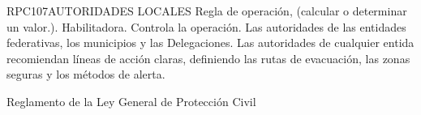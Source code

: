 \begin{BusinessRule}{RPC107}{AUTORIDADES LOCALES}{
		Regla de operación, (calcular o determinar un valor.).
	}{
		Habilitadora. 
	}{
		Controla la operación. %
	}
	\BRItem[Descripción:] Las autoridades de las entidades federativas, los municipios y las Delegaciones.
	Las autoridades de cualquier entida recomiendan líneas de acción claras, definiendo las rutas de evacuación, las zonas seguras  y los métodos de alerta.
	
	
	 Reglamento de la Ley General de Protección Civil
\end{BusinessRule}